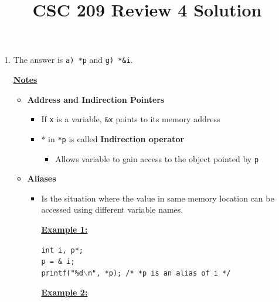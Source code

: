 \documentclass[12pt]{article}
\begin{document}
\title{CSC 209 Review 4 Solution}
\maketitle

\bigskip

\begin{enumerate}[1.]
    \item

    The answer is \texttt{a) *p} and \texttt{g) *\&i}.

    \bigskip

    \underline{\textbf{Notes}}

    \bigskip

    \begin{itemize}
        \item \textbf{Address and Indirection Pointers}

        \begin{itemize}
            \item If \texttt{x} is a variable, \texttt{\&x} points to its memory address
            \item * in \texttt{*p} is called \textbf{Indirection operator}
            \begin{itemize}
                \item Allows variable to gain access to the object pointed by \texttt{p}
            \end{itemize}
        \end{itemize}
        \item \textbf{Aliases}

        \begin{itemize}
            \item Is the situation where the value in same memory location can be accessed using different variable names.

            \bigskip

            \underline{\textbf{Example 1:}}

            \bigskip

            \texttt{int i, p*;\\
            p = \& i;\\
            printf("\%d$\backslash$n", *p); /* *p is an alias of i */}

            \bigskip

            \underline{\textbf{Example 2:}}

            \bigskip


\end{itemize}
\end{itemize}
\end{enumerate}
\end{document}
